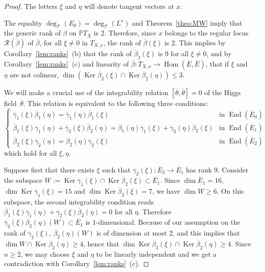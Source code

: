 \documentclass[JEP,XML,SOM,Unicode,NoFloatCountersInSection]{cedram}
\let\mathcal\mathscr
\theoremstyle{plain}
\theoremstyle{definition}
\let\ov\overline
\DeclareMathOperator{\End}{End}
\DeclareMathOperator{\Hom}{Hom}
\DeclareMathOperator{\Ker}{Ker}
\newcommand{\cR}{\mathcal{R}}
\newcommand{\cT}{\mathcal{T}}
\newcommand{\PTX}{{\mathbb{P}T_X}}
\newcommand{\ovE}{\ov{E}}
\newcommand{\ovb}{\ov{\beta}}
\newcommand{\ovg}{\ov{\gamma}}
\newcommand{\ovt}{\ov{\theta}}
\begin{document}
\begin{proof}
The
letters $\xi$ and $\eta$ will denote tangent
vectors at $x$.

The equality $\deg_\cT(E_0)=\deg_\cT(L^\star)$ and Theorem~\ref{theo:MW} imply that the generic rank
of $\beta$ on $\PTX$ is 2. Therefore, since
$x$ belongs to the regular locus $\cR(\ovb)$ of $\ovb$, for all $\xi\neq 0$ in $T_{X,x}$, the
rank of $\ovb(\xi)$ is 2. This implies by
Corollary~\ref{lem:ranks}~(b) that the rank of $\ovb_2(\xi)$ is 9 for all $\xi\neq 0$, and by
Corollary~\ref{lem:ranks}~(c) and linearity of $\bar\beta: T_{X,x}\to \Hom(\bar E,\bar E)$, that if $\xi$
and $\eta$ are not colinear, $\dim(\Ker\ovb_2(\xi)\cap\Ker\ovb_2(\eta))\leq 3$.

We will make a crucial use of the
integrability relation $[\ovt,\ovt]=0$ of the Higgs field~$\ovt$. This relation is equivalent to the
following three conditions:
$$
\begin{cases}
\ovg_1(\xi)\ovb_1(\eta) = \ovg_1(\eta)\ovb_1(\xi) & \mbox{in } \End(\ovE_0)\\
\ovb_1(\xi)\ovg_1(\eta)+\ovg_2(\xi)\ovb_2(\eta) = \ovb_1(\eta)\ovg_1(\xi)+\ovg_2(\eta)\ovb_2(\xi) & \mbox{in } \End(\ovE_1) \\
\ovb_2(\xi)\ovg_2(\eta) = \ovb_2(\eta)\ovg_2(\xi) & \mbox{in } \End(\ovE_2)
\end{cases}
$$
which hold for all $\xi,\eta$.

Suppose first that there exists $\xi$ such that $\ovg_2(\xi):\ovE_2\to \ovE_1$ has rank 9. Consider
the subspace
$W:=\Ker\ovg_1(\xi)\cap\Ker \ovb_2(\xi)\subset \ovE_1$. Since $\dim \ovE_1=16$, $\dim
\Ker\ovg_1(\xi)=15$ and
$\dim\Ker\ovb_2(\xi)=7$, we have $\dim W\geq 6$. On this subspace, the second integrability
condition
reads $\ovb_1(\xi)\ovg_1(\eta)+\ovg_2(\xi)\ovb_2(\eta) =0$ for all $\eta$. Therefore
\hbox{$\ovg_2(\xi)\ovb_2(\eta)(W)\subset \ovE_1$} is
$1$-dimensional. Because of our assumption on the rank of $\ovg_2(\xi)$, $\ovb_2(\eta)(W)$ is of
dimension at most 2, and this implies that $\dim W\cap\Ker \ovb_2(\eta)\geq 4$, hence that $\dim
\Ker\ovb_2(\xi)\cap\Ker\ovb_2(\eta)\geq 4$. Since $n\geq 2$, we may choose $\xi$ and $\eta$ to be
linearly independent and we get a contradiction with Corollary~\ref{lem:ranks}~(c).


\end{proof}
\end{document}
